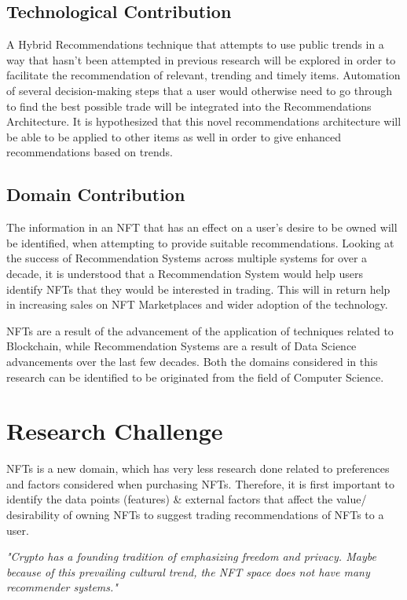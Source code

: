 \documentclass[a4paper, 12pt, oneside]{report}
\begin{document}
\section{Technological Contribution}

A Hybrid Recommendations technique that attempts to use public trends in a way that hasn't been attempted in previous research will be explored in order to facilitate the recommendation of relevant, trending and timely items. Automation of several decision-making steps that a user would otherwise need to go through to find the best possible trade will be integrated into the Recommendations Architecture. It is hypothesized that this novel recommendations architecture will be able to be applied to other items as well in order to give enhanced recommendations based on trends.

\section{Domain Contribution}

The information in an NFT that has an effect on a user's desire to be owned will be identified, when attempting to provide suitable recommendations.
Looking at the success of Recommendation Systems across multiple systems for over a decade, it is understood that a Recommendation System would help users identify NFTs that they would be interested in trading. This will in return help in increasing sales on NFT Marketplaces and wider adoption of the technology.

\bigbreak
NFTs are a result of the advancement of the application of techniques related to Blockchain, while Recommendation Systems are a result of Data Science advancements over the last few decades. Both the domains considered in this research can be identified to be originated from the field of Computer Science.


\chapter{Research Challenge}
NFTs is a new domain, which has very less research done related to preferences and factors considered when purchasing NFTs.
Therefore, it is first important to identify the data points (features) \& external factors that affect the value/ desirability of owning NFTs to suggest trading recommendations of NFTs to a user.

\bigbreak
\textit{"Crypto has a founding tradition of emphasizing freedom and privacy. Maybe because of this prevailing cultural trend, the NFT space does not have many recommender systems."} \autocite{noauthor_what_2020}
\end{document}
